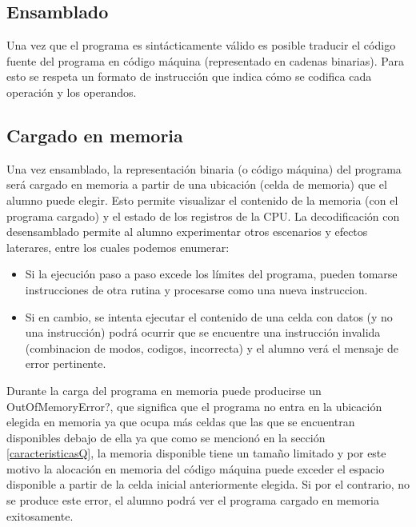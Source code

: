 \subsection{Ensamblado}

Una vez que el programa es sintácticamente válido es posible traducir el código fuente del programa en código máquina (representado en cadenas binarias). Para esto se respeta un formato de instrucción que indica cómo se codifica cada operación y los operandos. 


\subsection{Cargado en memoria}

Una vez ensamblado, la representación binaria (o código máquina) del programa será cargado en memoria a partir de una ubicación (celda de memoria) que el alumno puede elegir. Esto permite visualizar el contenido de la memoria (con el programa cargado) y el estado de los registros de la CPU. La decodificación con desensamblado permite al alumno experimentar otros escenarios y efectos laterares, entre los cuales podemos enumerar:

\begin{itemize}
\item Si la ejecución paso a paso excede los límites del programa, pueden tomarse instrucciones de otra rutina y procesarse como una nueva instruccion.
\item Si en cambio, se intenta ejecutar el contenido de una celda con datos (y no una instrucción) podrá ocurrir que se encuentre una instrucción invalida (combinacion de modos, codigos, incorrecta) y el alumno verá el mensaje de error pertinente.
\end{itemize}

Durante la carga del programa en memoria puede producirse un OutOfMemoryError?, que significa que el programa no entra en la ubicación elegida en memoria ya que ocupa más celdas que las que se encuentran disponibles debajo de ella ya que como se mencionó en la sección \ref{caracteristicasQ}, la memoria disponible tiene un tamaño limitado y por este motivo la alocación en memoria del código máquina puede exceder el espacio disponible a partir de la celda inicial anteriormente elegida. Si por el contrario, no se produce este error, el alumno podrá ver el programa cargado en memoria exitosamente.

